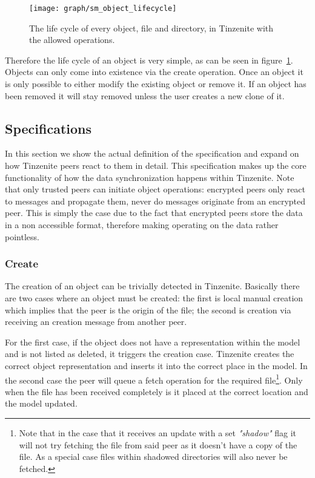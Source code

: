 \begin{figure}[htp]
\centering
    \texttt{[image: graph/sm\_object\_lifecycle]}
\caption[Object State Diagram]{The life cycle of every object, file and directory, in Tinzenite with the allowed operations.}
\label{diagram:object_operations}
\end{figure}

Therefore the life cycle of an object is very simple, as can be seen in figure~\ref{diagram:object_operations}.
Objects can only come into existence via the create operation.
Once an object it is only possible to either modify the existing object or remove it.
If an object has been removed it will stay removed unless the user creates a new clone of it.

\subsection{Specifications}
\label{sub:Specifications}

In this section we show the actual definition of the specification and expand on how Tinzenite peers react to them in detail.
This specification makes up the core functionality of how the data synchronization happens within Tinzenite.
Note that only trusted peers can initiate object operations: encrypted peers only react to messages and propagate them, never do messages originate from an encrypted peer.
This is simply the case due to the fact that encrypted peers store the data in a non accessible format, therefore making operating on the data rather pointless.

\subsubsection{Create}
\label{subs:Create}

The creation of an object can be trivially detected in Tinzenite.
Basically there are two cases where an object must be created: the first is local manual creation which implies that the peer is the origin of the file; the second is creation via receiving an creation message from another peer.

For the first case, if the object does not have a representation within the model and is not listed as deleted, it triggers the creation case.
Tinzenite creates the correct object representation and inserts it into the correct place in the model.
In the second case the peer will queue a fetch operation for the required file\footnote{Note that in the case that it receives an update with a set \textit{"shadow"} flag it will not try fetching the file from said peer as it doesn't have a copy of the file. As a special case files within shadowed directories will also never be fetched.}.
Only when the file has been received completely is it placed at the correct location and the model updated.


